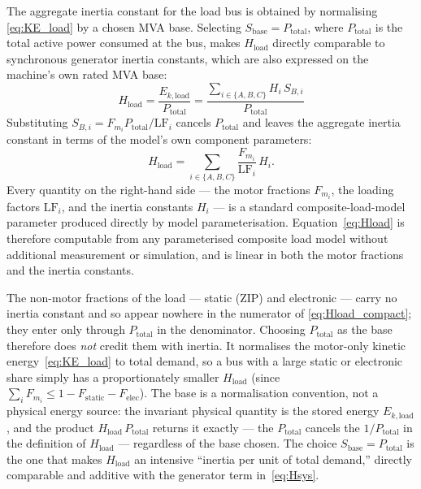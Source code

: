 \documentclass[journal]{IEEEtran}
\begin{document}
The aggregate inertia constant for the load bus is obtained by normalising \eqref{eq:KE_load} by a chosen MVA base. Selecting $S_{\mathrm{base}} = P_{\mathrm{total}}$, where $P_{\mathrm{total}}$ is the total active power consumed at the bus, makes $H_{\mathrm{load}}$ directly comparable to synchronous generator inertia constants, which are also expressed on the machine's own rated MVA base:
\begin{equation}
    H_{\mathrm{load}} = \frac{E_{k,\mathrm{load}}}{P_{\mathrm{total}}} = \frac{\displaystyle\sum_{i \in \{A,B,C\}} H_i\, S_{B,i}}{P_{\mathrm{total}}}
    \label{eq:Hload_compact}
\end{equation}
Substituting $S_{B,i} = F_{m_i} P_{\mathrm{total}}/\mathrm{LF}_i$ cancels $P_{\mathrm{total}}$ and leaves the aggregate inertia constant in terms of the model's own component parameters:
\begin{equation}
    H_{\mathrm{load}} = \sum_{i \in \{A,B,C\}} \frac{F_{m_i}}{\mathrm{LF}_i}\, H_i .
    \label{eq:Hload}
\end{equation}
Every quantity on the right-hand side --- the motor fractions $F_{m_i}$, the loading factors $\mathrm{LF}_i$, and the inertia constants $H_i$ --- is a standard composite-load-model parameter produced directly by model parameterisation. Equation~\eqref{eq:Hload} is therefore computable from any parameterised composite load model without additional measurement or simulation, and is linear in both the motor fractions and the inertia constants.

The non-motor fractions of the load --- static (ZIP) and electronic --- carry no inertia constant and so appear nowhere in the numerator of \eqref{eq:Hload_compact}; they enter only through $P_{\mathrm{total}}$ in the denominator. Choosing $P_{\mathrm{total}}$ as the base therefore does \emph{not} credit them with inertia. It normalises the motor-only kinetic energy~\eqref{eq:KE_load} to total demand, so a bus with a large static or electronic share simply has a proportionately smaller $H_{\mathrm{load}}$ (since $\sum_i F_{m_i}\le 1-F_{\mathrm{static}}-F_{\mathrm{elec}}$). The base is a normalisation convention, not a physical energy source: the invariant physical quantity is the stored energy $E_{k,\mathrm{load}}$, and the product $H_{\mathrm{load}}\,P_{\mathrm{total}}$ returns it exactly --- the $P_{\mathrm{total}}$ cancels the $1/P_{\mathrm{total}}$ in the definition of $H_{\mathrm{load}}$ --- regardless of the base chosen. The choice $S_{\mathrm{base}}=P_{\mathrm{total}}$ is the one that makes $H_{\mathrm{load}}$ an intensive ``inertia per unit of total demand,'' directly comparable and additive with the generator term in~\eqref{eq:Hsys}.
\end{document}
